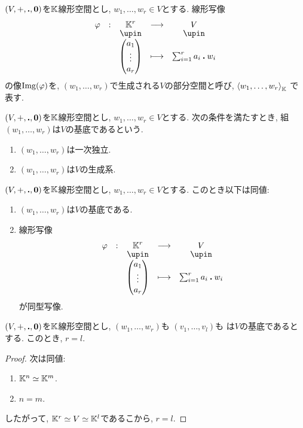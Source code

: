 \begin{definition}
  $(V,+,\mathbin{\boldsymbol{.}},\boldsymbol{0})$を$\mathbb{K}$線形空間とし,
  $w_1,\ldots,w_r\in V$とする.
  線形写像
  \begin{align*}
    \shazo{\varphi}{\KK^r}{V}
          {\begin{pmatrix}a_1\\\vdots\\a_r\end{pmatrix}}{\sum_{i=1}^{r}a_i\act w_i}
  \end{align*}
  の像$\operatorname{Img}(\varphi)$を,
  $(w_1,\ldots,w_r)$で生成される$V$の部分空間と呼び,
  $\Braket{w_1,\ldots,w_r}_{\mathbb{K}}$
  で表す.  
\end{definition}


\begin{definition}
  $(V,+,\mathbin{\boldsymbol{.}},\boldsymbol{0})$を$\mathbb{K}$線形空間とし,
  $w_1,\ldots,w_r\in V$とする.
  次の条件を満たすとき,
  組$(w_1,\ldots,w_r)$は$V$の基底であるという.
  \begin{enumerate}
  \item $(w_1,\ldots,w_r)$は一次独立.
  \item $(w_1,\ldots,w_r)$は$V$の生成系.
  \end{enumerate}
\end{definition}
\begin{prop}
  $(V,+,\mathbin{\boldsymbol{.}},\boldsymbol{0})$を$\mathbb{K}$線形空間とし,
  $w_1,\ldots,w_r\in V$とする.
  このとき以下は同値:
  \begin{enumerate}
  \item $(w_1,\ldots,w_r)$は$V$の基底である.
  \item 線形写像
    \begin{align*}
      \shazo{\varphi}{\KK^r}{V}
      {\begin{pmatrix}a_1\\\vdots\\a_r\end{pmatrix}}{\sum_{i=1}^{r}a_i\act w_i}
    \end{align*}
    が同型写像.
  \end{enumerate}
\end{prop}

\begin{lemma}
  $(V,+,\mathbin{\boldsymbol{.}},\boldsymbol{0})$を$\mathbb{K}$線形空間とし,
  $(w_1,\ldots,w_r)$も
  $(v_1,\ldots,v_l)$も
  は$V$の基底であるとする.
  このとき, $r=l$.
\end{lemma}
\begin{proof}
  次は同値:
  \begin{enumerate}
  \item $\mathbb{K}^n\simeq \mathbb{K}^m$.
  \item $n=m$.
  \end{enumerate}
  したがって,
  $\mathbb{K}^r \simeq V\simeq \mathbb{K}^l$であるこから,
  $r=l$.
\end{proof}

